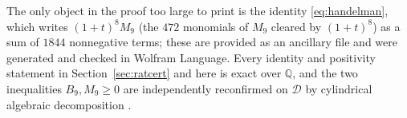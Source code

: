 \documentclass[11pt]{article}
\theoremstyle{plain}
\theoremstyle{definition}
\begin{document}
The only object in the proof too large to print is the identity \eqref{eq:handelman}, which writes
$(1+t)^8M_9$ (the $472$ monomials of $M_9$ cleared by $(1+t)^8$) as a sum of $1844$ nonnegative terms; these
are provided as an ancillary file and were generated and checked in Wolfram Language.
Every identity and positivity statement in Section~\ref{sec:ratcert} and here is exact over $\mathbb Q$, and the
two inequalities $B_9,M_9\ge0$ are independently reconfirmed on $\mathcal D$ by cylindrical algebraic
decomposition \cite{BasuPollackRoy}.
\end{document}
